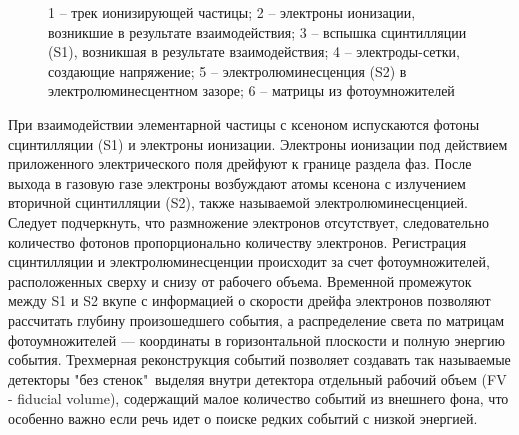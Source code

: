 \begin{figure}[h]
	\caption[Схема работы двухфазного детектора.] {1 -- трек ионизирующей частицы; 2 -- электроны ионизации, возникшие в результате взаимодействия; 3 -- вспышка сцинтилляции (S1), возникшая в результате взаимодействия; 4 -- электроды-сетки, создающие напряжение; 5 -- электролюминесценция (S2) в электролюминесцентном зазоре; 6 -- матрицы из фотоумножителей}
	\label{img:twophase}
\end{figure}

При взаимодействии элементарной частицы с ксеноном испускаются фотоны сцинтилляции (S1) и электроны ионизации.  Электроны ионизации под действием приложенного электрического поля дрейфуют к границе раздела фаз. После выхода в газовую газе электроны возбуждают атомы ксенона с излучением вторичной сцинтилляции (S2), также называемой электролюминесценцией. Следует подчеркнуть, что размножение электронов отсутствует, следовательно количество фотонов пропорционально количеству электронов. Регистрация сцинтилляции и электролюминесценции происходит за счет фотоумножителей, расположенных сверху и снизу от рабочего объема. Временной промежуток между S1 и S2 вкупе с информацией о скорости дрейфа электронов позволяют рассчитать глубину произошедшего события, а распределение света по матрицам фотоумножителей — координаты в горизонтальной плоскости и полную энергию события. Трехмерная реконструкция событий позволяет создавать так называемые детекторы  "без стенок"\, выделяя внутри детектора отдельный рабочий объем (FV - fiducial volume), содержащий малое количество событий из внешнего фона, что особенно важно если речь идет о поиске редких событий с низкой энергией.

